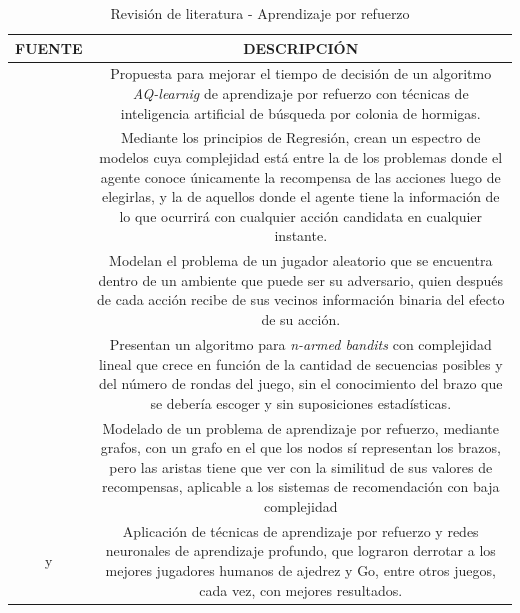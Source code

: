 \begin{table}[!h] 
\caption{Revisión de literatura - Aprendizaje por refuerzo}
\centering
\begin{tabular}{cc}
\textbf{FUENTE}   & \textbf{DESCRIPCIÓN}   \\ \hline
\multicolumn{1}{|l|}{\citet{lee2005reinforcement}} & \multicolumn{1}{p{10cm}|}{Propuesta para mejorar el tiempo de decisión de un algoritmo \textit{AQ-learnig} de aprendizaje por refuerzo con técnicas de inteligencia artificial de búsqueda por colonia de hormigas.} \\ \hline
\multicolumn{1}{|l|}{\citet{alon2017nonstochastic}}   & \multicolumn{1}{p{10cm}|}{Mediante los principios de Regresión, crean un espectro de modelos cuya complejidad está entre la de los problemas donde el agente conoce únicamente la recompensa de las acciones luego de elegirlas, y la de aquellos donde el agente tiene la información de lo que ocurrirá con cualquier acción candidata en cualquier instante.} \\ \hline
\multicolumn{1}{|l|}{\citet{alon2015online}}   & \multicolumn{1}{p{10cm}|}{Modelan el problema de un jugador aleatorio que se encuentra dentro de un ambiente que puede ser su adversario, quien después de cada acción recibe de sus vecinos información binaria del efecto de su acción.} \\ \hline
\multicolumn{1}{|l|}{\citet{gokcesu2018online}}   & \multicolumn{1}{p{10cm}|}{Presentan un algoritmo para \textit{n-armed bandits} con complejidad lineal que crece en función de la cantidad de secuencias posibles y del número de rondas del juego, sin el conocimiento del brazo que se debería escoger y sin suposiciones estadísticas.} \\ \hline
\multicolumn{1}{|l|}{\citet{8170860}}   & \multicolumn{1}{p{10cm}|}{Modelado de un problema de aprendizaje por refuerzo, mediante grafos, con un grafo en el que los nodos sí representan los brazos, pero las aristas tiene que ver con la similitud de sus valores de recompensas, aplicable a los sistemas de recomendación con baja complejidad} \\ \hline
\multicolumn{1}{|p{4cm}|}{\citet{silver2017mastering} y \citet{silver2016mastering}}   & \multicolumn{1}{p{10cm}|}{Aplicación de técnicas de aprendizaje por refuerzo y redes neuronales de aprendizaje profundo, que lograron derrotar a los mejores jugadores humanos de ajedrez y Go, entre otros juegos, cada vez, con mejores resultados.} \\ \hline
\end{tabular}
\label{tab:litera2}
\end{table}

